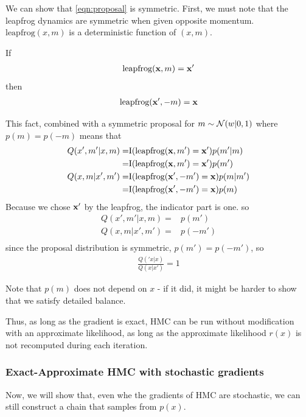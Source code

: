 \documentclass{article}
\begin{document}
We can show that \eqref{eqn:proposal} is symmetric.  First, we must note that the leapfrog dynamics are symmetric when given opposite momentum.  $\textrm{leapfrog}(x, m)$ is a deterministic function of $(x,m)$.

If
\begin{align}
\textrm{leapfrog}({\bf{x}}, m) = {\bf{x}}'
\end{align}
then
\begin{align}
\textrm{leapfrog}({\bf{x}}', -m) = {\bf{x}}
\end{align}

This fact, combined with a symmetric proposal for $m \sim \mathcal{N}\!\left(w|0,1\right)$ where $p(m) = p(-m)$ means that 
%
\begin{align}
Q( x', m' | x, m ) = & \textrm{I}( \textrm{leapfrog}({\bf{x}}, m') = {\bf{x}}' )p(m'|m) \\
= & \textrm{I}( \textrm{leapfrog}({\bf{x}}, m') = {\bf{x}}' )p(m') \\
Q( x, m | x', m' ) = & \textrm{I}( \textrm{leapfrog}({\bf{x}}', -m') = {\bf{x}} )p(m|m') \\
= & \textrm{I}( \textrm{leapfrog}({\bf{x}}', -m') = {\bf{x}} )p(m) \\
\end{align}
%
Because we chose ${\bf{x}}'$ by the leapfrog, the indicator part is one.  so
%
\begin{align}
Q( x', m' | x, m ) = & p(m') \\
Q( x, m | x', m' ) = & p(-m') \\
\end{align}
%
since the proposal distribution is symmetric, $p(m') = p(-m')$, so
\begin{align}
\frac{Q( 'x | x )}{Q( x | x' )} = 1
\end{align}


Note that $p(m)$ does not depend on $x$ - if it did, it might be harder to show that we satisfy detailed balance.

Thus, as long as the gradient is exact, HMC can be run without modification with an approximate likelihood, as long as the approximate likelihood $r(x)$ is not recomputed during each iteration.

\subsubsection{Exact-Approximate HMC with stochastic gradients}

Now, we will show that, even whe the gradients of HMC are stochastic, we can still construct a chain that samples from $p(x)$.
\end{document}
